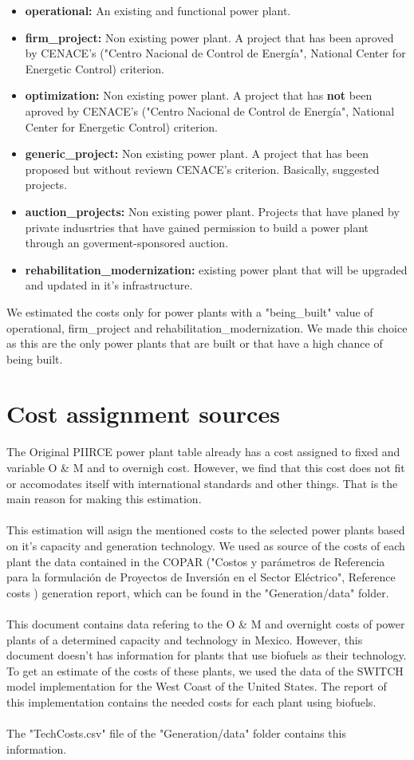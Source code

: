 \documentclass[letterpaper,12pt]{article}
\begin{document}
\begin{itemize}
\item \textbf{operational: } An existing and functional power plant.
\item \textbf{firm\_project:} Non existing power plant. A project that has been aproved by CENACE's ("Centro Nacional de Control de Energía", National Center for Energetic Control) criterion.
\item \textbf{optimization:} Non existing power plant. A project that has \textbf{not} been aproved by CENACE's ("Centro Nacional de Control de Energía", National Center for Energetic Control) criterion.
\item \textbf{generic\_project:} Non existing power plant. A project that has been proposed but without reviewn CENACE's criterion. Basically, suggested projects.
\item \textbf{auction\_projects:} Non existing power plant. Projects that have planed by private indusrtries that have gained permission to build a power plant through an goverment-sponsored auction.
\item \textbf{rehabilitation\_modernization:} existing power plant that will be upgraded and updated in it's infrastructure.
\end{itemize}
We estimated the costs only for power plants with a "being\_built" value of operational, firm\_project and rehabilitation\_modernization. We made this choice as this are the only power plants that are built or that have a high chance of being built.
\section{Cost assignment sources}
The Original PIIRCE power plant table already has a cost assigned to fixed and variable O \& M and to overnigh cost. However, we find that this cost does not fit or accomodates itself with international standards and other things. That is the main reason for making this estimation.
\\
\\This estimation will asign the mentioned costs to the selected power plants based on it's capacity and generation technology. We used as source of the costs of each plant the data contained in the COPAR ("Costos y parámetros de Referencia para la formulación de Proyectos de Inversión en el Sector Eléctrico", Reference costs ) generation report, which can be found in the "Generation/data" folder\cite{copar}.
\\
\\This document contains data refering to the O \& M and overnight costs of power plants of a determined capacity and technology in Mexico. However, this document doesn't has information for plants that use biofuels as their technology. To get an estimate of the costs of these plants, we used the data of the SWITCH model implementation for the West Coast of the United States. The report\cite{us} of this implementation contains the needed costs for each plant using biofuels.
\\
\\The "TechCosts.csv" file of the "Generation/data" folder contains this information.
\end{document}
